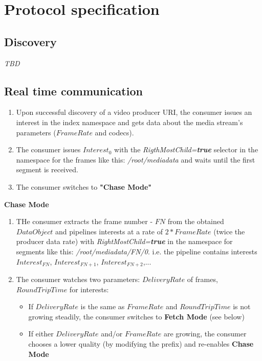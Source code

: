 \documentclass[12pt]{article}
\begin{document}
\section{Protocol specification}
\subsection{Discovery}
\textit{TBD}

\subsection{Real time communication}
\begin{enumerate}
\item Upon successful discovery of a video producer URI, the consumer issues an interest in the index namespace and gets data about the media stream's parameters ($FrameRate$ and codecs).
\item The consumer issues $Interest_{0}$ with the \textit{RigthMostChild=\textbf{true}} selector in the namespace for the frames like this: \textit{/root/mediadata} and waits until the first segment is received.
\item The consumer switches to \textbf{"Chase Mode"}
\end{enumerate}

\textbf{Chase Mode}
\begin{enumerate}
\item THe consumer extracts the frame number - $FN$ from the obtained $DataObject$ and pipelines interests at a rate of $2*FrameRate$ (twice the producer data rate) with \textit{RightMostChild=\textbf{true}} in the namespace for segments like this: \textit{/root/mediadata/FN/0}. i.e. the pipeline contains interests $Interest_{FN}$, $Interest_{FN+1}$, $Interest_{FN+2}$,...

\item The consumer watches two parameters: $DeliveryRate$ of frames, $RoundTripTime$ for interests:
\begin{itemize}
\item If $DeliveryRate$ is the same as $FrameRate$  and $RoundTripTime$ is not growing steadily, the consumer switches to \textbf{Fetch Mode} (see below)
\item If either $DeliveryRate$ and/or $FrameRate$ are growing, the consumer chooses a lower quality (by modifying the prefix) and re-enables \textbf{Chase Mode}
\end{itemize}
\end{enumerate}
\end{document}
